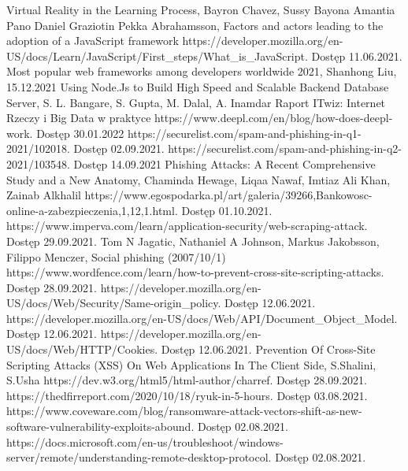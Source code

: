 \documentclass[12pt,twoside]{article}
\begin{document}
\begin{thebibliography}{4}
Virtual Reality in the Learning Process, Bayron Chavez, Sussy Bayona
 Amantia Pano Daniel Graziotin Pekka Abrahamsson, Factors and actors leading to the adoption of a JavaScript framework 
 https://developer.mozilla.org/en-US/docs/Learn/JavaScript/First{\_}steps/What{\_}is{\_}JavaScript. Dostęp 11.06.2021.
 Most popular web frameworks among developers worldwide 2021, Shanhong Liu, 15.12.2021
 Using Node.Js to Build High Speed and Scalable Backend Database Server, S. L. Bangare, S. Gupta, M. Dalal, A. Inamdar
 Raport ITwiz: Internet Rzeczy i Big Data w praktyce
https://www.deepl.com/en/blog/how-does-deepl-work. Dostęp 30.01.2022
 https://securelist.com/spam-and-phishing-in-q1-2021/102018. Dostęp 02.09.2021.
 https://securelist.com/spam-and-phishing-in-q2-2021/103548. Dostęp 14.09.2021
 Phishing Attacks: A Recent Comprehensive Study and a New Anatomy, Chaminda Hewage, Liqaa Nawaf, Imtiaz Ali Khan, Zainab Alkhalil
 https://www.egospodarka.pl/art/galeria/39266,Bankowosc-online-a-zabezpieczenia,1,12,1.html. Dostęp 01.10.2021.
 https://www.imperva.com/learn/application-security/web-scraping-attack. Dostęp 29.09.2021.
 Tom N Jagatic, Nathaniel A Johnson, Markus Jakobsson, Filippo Menczer, Social phishing (2007/10/1)
 https://www.wordfence.com/learn/how-to-prevent-cross-site-scripting-attacks. Dostęp 28.09.2021.
 https://developer.mozilla.org/en-US/docs/Web/Security/Same-origin{\_}policy. Dostęp 12.06.2021.
 https://developer.mozilla.org/en-US/docs/Web/API/Document{\_}Object{\_}Model. Dostęp 12.06.2021. 
 https://developer.mozilla.org/en-US/docs/Web/HTTP/Cookies. Dostęp 12.06.2021.
 Prevention Of Cross-Site Scripting Attacks (XSS) On Web Applications In The Client Side, S.Shalini, S.Usha
 https://dev.w3.org/html5/html-author/charref. Dostęp 28.09.2021.
 https://thedfirreport.com/2020/10/18/ryuk-in-5-hours. Dostęp 03.08.2021.
 https://www.coveware.com/blog/ransomware-attack-vectors-shift-as-new-software-vulnerability-exploits-abound. Dostęp 02.08.2021.
 https://docs.microsoft.com/en-us/troubleshoot/windows-server/remote/understanding-remote-desktop-protocol. Dostęp 02.08.2021.

\end{thebibliography}
\end{document}
